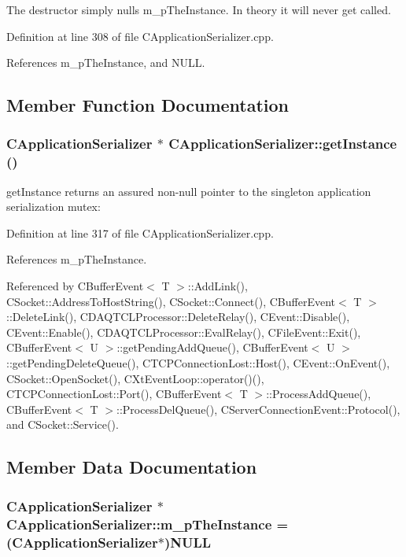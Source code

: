 The destructor simply nulls m\_\-p\-The\-Instance. In theory it will never get called. 

Definition at line 308 of file CApplication\-Serializer.cpp.

References m\_\-p\-The\-Instance, and NULL.

\subsection{Member Function Documentation}
\subsubsection{\setlength{\rightskip}{0pt plus 5cm}CApplication\-Serializer $\ast$ CApplication\-Serializer::get\-Instance ()\hspace{0.3cm}{\tt  [static]}}\label{classCApplicationSerializer_d0}


get\-Instance returns an assured non-null pointer to the singleton application serialization mutex: 

Definition at line 317 of file CApplication\-Serializer.cpp.

References m\_\-p\-The\-Instance.

Referenced by CBuffer\-Event$<$ T $>$::Add\-Link(), CSocket::Address\-To\-Host\-String(), CSocket::Connect(), CBuffer\-Event$<$ T $>$::Delete\-Link(), CDAQTCLProcessor::Delete\-Relay(), CEvent::Disable(), CEvent::Enable(), CDAQTCLProcessor::Eval\-Relay(), CFile\-Event::Exit(), CBuffer\-Event$<$ U $>$::get\-Pending\-Add\-Queue(), CBuffer\-Event$<$ U $>$::get\-Pending\-Delete\-Queue(), CTCPConnection\-Lost::Host(), CEvent::On\-Event(), CSocket::Open\-Socket(), CXt\-Event\-Loop::operator()(), CTCPConnection\-Lost::Port(), CBuffer\-Event$<$ T $>$::Process\-Add\-Queue(), CBuffer\-Event$<$ T $>$::Process\-Del\-Queue(), CServer\-Connection\-Event::Protocol(), and CSocket::Service().

\subsection{Member Data Documentation}
\subsubsection{\setlength{\rightskip}{0pt plus 5cm}CApplication\-Serializer $\ast$ CApplication\-Serializer::m\_\-p\-The\-Instance = (CApplication\-Serializer$\ast$)NULL\hspace{0.3cm}{\tt  [static, private]}}\label{classCApplicationSerializer_r0}


